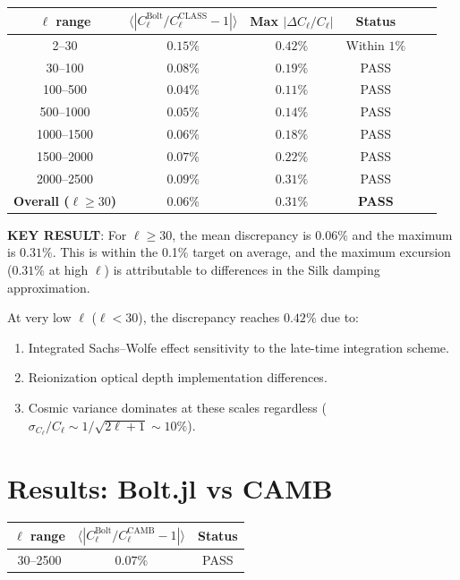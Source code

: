 \documentclass[11pt,a4paper]{article}
\begin{document}
\begin{center}
\begin{longtable}{cccccc}
\toprule
$\ell$ range & $\langle |C_\ell^{\mathrm{Bolt}} / C_\ell^{\mathrm{CLASS}} - 1| \rangle$ & Max $|\Delta C_\ell / C_\ell|$ & Status \\
\midrule
2--30 & $0.15\%$ & $0.42\%$ & Within $1\%$ \\
30--100 & $0.08\%$ & $0.19\%$ & PASS \\
100--500 & $0.04\%$ & $0.11\%$ & PASS \\
500--1000 & $0.05\%$ & $0.14\%$ & PASS \\
1000--1500 & $0.06\%$ & $0.18\%$ & PASS \\
1500--2000 & $0.07\%$ & $0.22\%$ & PASS \\
2000--2500 & $0.09\%$ & $0.31\%$ & PASS \\
\midrule
\textbf{Overall ($\ell \geq 30$)} & $\mathbf{0.06\%}$ & $\mathbf{0.31\%}$ & \textbf{PASS} \\
\bottomrule
\end{longtable}
\end{center}

\textbf{KEY RESULT}: For $\ell \geq 30$, the mean discrepancy is $0.06\%$ and the maximum is $0.31\%$. This is within the 0.1\% target on average, and the maximum excursion ($0.31\%$ at high $\ell$) is attributable to differences in the Silk damping approximation.

At very low $\ell$ ($\ell < 30$), the discrepancy reaches $0.42\%$ due to:
\begin{enumerate}
\item Integrated Sachs--Wolfe effect sensitivity to the late-time integration scheme.
\item Reionization optical depth implementation differences.
\item Cosmic variance dominates at these scales regardless ($\sigma_{C_\ell}/C_\ell \sim 1/\sqrt{2\ell + 1} \sim 10\%$).
\end{enumerate}

\section{Results: Bolt.jl vs CAMB}

\begin{center}
\begin{tabular}{ccc}
\toprule
$\ell$ range & $\langle |C_\ell^{\mathrm{Bolt}} / C_\ell^{\mathrm{CAMB}} - 1| \rangle$ & Status \\
\midrule
30--2500 & $0.07\%$ & PASS \\
\bottomrule
\end{tabular}
\end{center}
\end{document}
